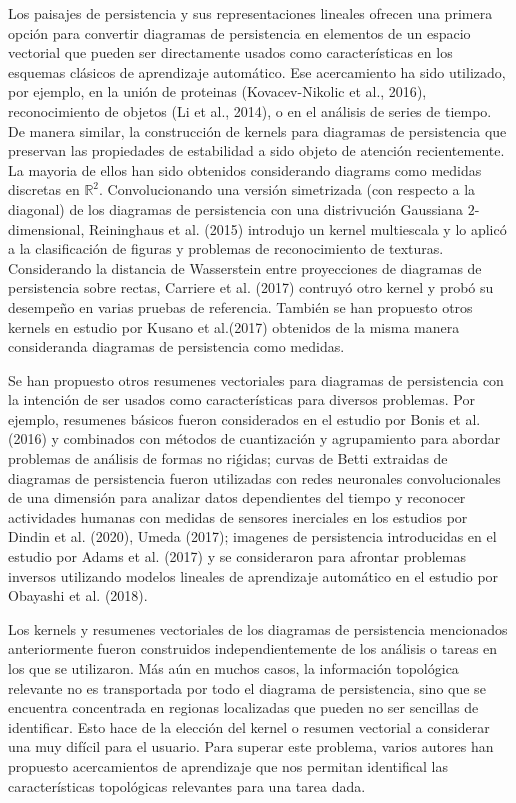 Los paisajes de persistencia y sus representaciones lineales ofrecen una primera opci\'on
para convertir diagramas de persistencia en elementos de un espacio vectorial que pueden ser
directamente usados  como caracter\'isticas en los esquemas cl\'asicos de
aprendizaje autom\'atico.
Ese acercamiento ha sido utilizado, por ejemplo, en la uni\'on de proteinas
(Kovacev-Nikolic et al., 2016\cite{Kovacev2016}), reconocimiento de objetos
(Li et al., 2014\cite{Li2014}), o en el an\'alisis de series de tiempo.
De manera similar, la construcci\'on de kernels para diagramas de persistencia
que preservan las propiedades de estabilidad a sido objeto de atenci\'on recientemente.
La mayoria de ellos han sido obtenidos considerando diagrams como medidas discretas en
$\mathbb{R}^{2}$.
Convolucionando una versi\'on simetrizada (con respecto a la diagonal)
de los diagramas de persistencia con una distrivuci\'on Gaussiana $2$-dimensional,
Reininghaus et al. (2015)\cite{Reini2015} introdujo un kernel multiescala y lo aplic\'o
a la clasificaci\'on de figuras y problemas de reconocimiento de texturas.
Considerando la distancia de Wasserstein entre proyecciones de diagramas de persistencia
sobre rectas, Carriere et al. (2017)\cite{Carriere2017} contruy\'o otro kernel y prob\'o
su desempe\~{n}o en varias pruebas de referencia.
Tambi\'en se han  propuesto otros kernels en estudio por Kusano et al.(2017)\cite{Kusano2017}
obtenidos de la misma manera consideranda diagramas de persistencia como medidas.

Se han propuesto otros resumenes vectoriales para diagramas de persistencia
con la intenci\'on de ser usados como caracter\'isticas para diversos problemas.
Por ejemplo, resumenes b\'asicos fueron considerados en el estudio por
Bonis et al. (2016)\cite{Bonis2016} y combinados con m\'etodos de cuantizaci\'on y
agrupamiento para abordar problemas de an\'alisis de formas no ri\'gidas;
curvas de Betti extraidas de diagramas de persistencia fueron utilizadas con
redes neuronales convolucionales de una dimensi\'on para analizar datos dependientes del
tiempo y reconocer actividades humanas con medidas de sensores inerciales en los estudios por
Dindin et al. (2020)\cite{Dindin2017}, Umeda (2017)\cite{Umeda2017};
imagenes de persistencia introducidas en el estudio por Adams et al. (2017)\cite{Adams2017}
y se consideraron para  afrontar problemas inversos utilizando
modelos lineales de aprendizaje autom\'atico
en el estudio por Obayashi et al. (2018)\cite{Obay2018}.

Los kernels y resumenes vectoriales de los diagramas de persistencia mencionados anteriormente
fueron construidos independientemente de los an\'alisis o tareas en los que se utilizaron.
M\'as a\'un en muchos casos, la informaci\'on topol\'ogica relevante no es transportada por
todo el diagrama de persistencia, sino que se encuentra concentrada en regionas localizadas
que pueden no ser sencillas de identificar. Esto hace de la elecci\'on del kernel
o resumen vectorial a considerar una muy dif\'icil para el usuario.
Para superar este problema, varios autores han propuesto acercamientos de aprendizaje que nos
permitan identifical las caracter\'isticas topol\'ogicas relevantes para una tarea dada.
